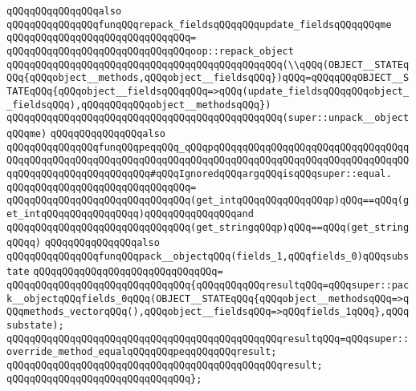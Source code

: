 \verb|qQQqqQQqqQQqqQQqalso|\newline
\verb|qQQqqQQqqQQqqQQqfunqQQqrepack_fieldsqQQqqQQqupdate_fieldsqQQqqQQqme|\newline
\verb|qQQqqQQqqQQqqQQqqQQqqQQqqQQqqQQq=|\newline
\verb|qQQqqQQqqQQqqQQqqQQqqQQqqQQqqQQqoop::repack_object|\newline
\verb|qQQqqQQqqQQqqQQqqQQqqQQqqQQqqQQqqQQqqQQqqQQqqQQq(\\qQQq(OBJECT__STATEqQQq{qQQqobject__methods,qQQqobject__fieldsqQQq})qQQq=qQQqqQQqOBJECT__STATEqQQq{qQQqobject__fieldsqQQqqQQq=>qQQq(update_fieldsqQQqqQQqobject__fieldsqQQq),qQQqqQQqqQQqobject__methodsqQQq})|\newline
\verb|qQQqqQQqqQQqqQQqqQQqqQQqqQQqqQQqqQQqqQQqqQQqqQQq(super::unpack__objectqQQqme)|\newline
\newline
\verb|qQQqqQQqqQQqqQQqalso|\newline
\verb|qQQqqQQqqQQqqQQqfunqQQqpeqqQQq_qQQqpqQQqqqQQqqQQqqQQqqQQqqQQqqQQqqQQqqQQqqQQqqQQqqQQqqQQqqQQqqQQqqQQqqQQqqQQqqQQqqQQqqQQqqQQqqQQqqQQqqQQqqQQqqQQqqQQqqQQqqQQqqQQqqQQq#qQQqIgnoredqQQqargqQQqisqQQqsuper::equal.|\newline
\verb|qQQqqQQqqQQqqQQqqQQqqQQqqQQqqQQq=|\newline
\verb|qQQqqQQqqQQqqQQqqQQqqQQqqQQqqQQq(get_intqQQqqQQqqQQqqQQqp)qQQq==qQQq(get_intqQQqqQQqqQQqqQQqq)qQQqqQQqqQQqqQQqand|\newline
\verb|qQQqqQQqqQQqqQQqqQQqqQQqqQQqqQQq(get_stringqQQqp)qQQq==qQQq(get_stringqQQqq)|\newline
\newline
\verb|qQQqqQQqqQQqqQQqalso|\newline
\verb|qQQqqQQqqQQqqQQqfunqQQqpack__objectqQQq(fields_1,qQQqfields_0)qQQqsubstate|\newline
\verb|qQQqqQQqqQQqqQQqqQQqqQQqqQQqqQQq=|\newline
\verb|qQQqqQQqqQQqqQQqqQQqqQQqqQQqqQQq{qQQqqQQqqQQqresultqQQq=qQQqsuper::pack__objectqQQqfields_0qQQq(OBJECT__STATEqQQq{qQQqobject__methodsqQQq=>qQQqmethods_vectorqQQq(),qQQqobject__fieldsqQQq=>qQQqfields_1qQQq},qQQqsubstate);|\newline
\verb|qQQqqQQqqQQqqQQqqQQqqQQqqQQqqQQqqQQqqQQqqQQqqQQqresultqQQq=qQQqsuper::override_method_equalqQQqqQQqpeqqQQqqQQqresult;|\newline
\verb|qQQqqQQqqQQqqQQqqQQqqQQqqQQqqQQqqQQqqQQqqQQqqQQqresult;|\newline
\verb|qQQqqQQqqQQqqQQqqQQqqQQqqQQqqQQq};|\newline
